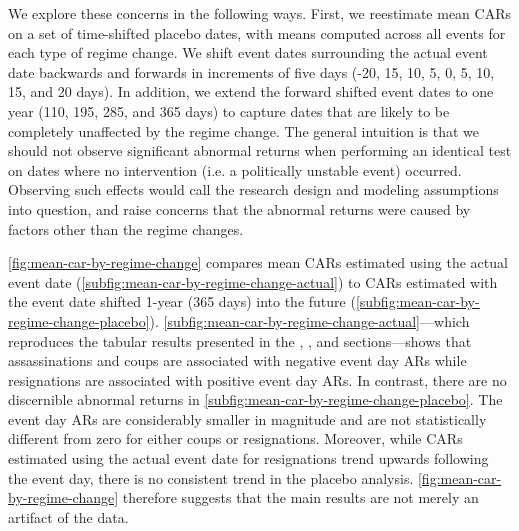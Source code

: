\documentclass[12pt,final,fleqn]{article}
\theoremstyle{plain}
\begin{document}
We explore these concerns in the following ways. First, we reestimate mean CARs on a set of time-shifted placebo dates, with means computed across all events for each type of regime change. We shift event dates surrounding the actual event date backwards and forwards in increments of five days (-20, 15, 10, 5, 0, 5, 10, 15, and 20 days). In addition, we extend the forward shifted event dates to one year (110, 195, 285, and 365 days) to capture dates that are likely to be completely unaffected by the regime change. The general intuition is that we should not observe significant abnormal returns when performing an identical test on dates where no intervention (i.e. a politically unstable event) occurred. Observing such effects would call the research design and modeling assumptions into question, and raise concerns that the abnormal returns were caused by factors other than the regime changes. 

\autoref{fig:mean-car-by-regime-change} compares mean CARs estimated using the actual event date (\autoref{subfig:mean-car-by-regime-change-actual}) to CARs estimated with the event date shifted 1-year (365 days) into the future (\autoref{subfig:mean-car-by-regime-change-placebo}). \autoref{subfig:mean-car-by-regime-change-actual}---which reproduces the tabular results presented in the , , and  sections---shows that assassinations and coups are associated with negative event day ARs while resignations are associated with positive event day ARs. In contrast, there are no discernible abnormal returns in \autoref{subfig:mean-car-by-regime-change-placebo}. The event day ARs are considerably smaller in magnitude and are not statistically different from zero for either coups or resignations. Moreover, while CARs estimated using the actual event date for resignations trend upwards following the event day, there is no consistent trend in the placebo analysis. \autoref{fig:mean-car-by-regime-change} therefore suggests that the main results are not merely an artifact of the data.  
\end{document}
